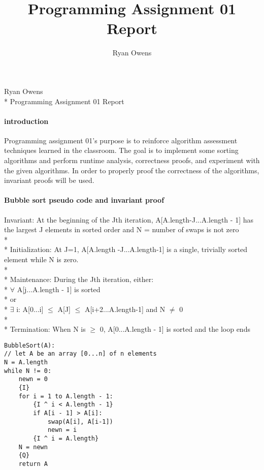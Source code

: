 \documentclass[10pt,letterpaper]{report}
\author{Ryan Owens}
\title{Programming Assignment 01 Report}
\begin{document}
	Ryan Owens
	\\* Programming Assignment 01 Report
\paragraph{introduction}
	Programming assignment 01's purpose is to reinforce algorithm assessment techniques learned in the classroom.  The goal is to implement some sorting algorithms and perform runtime analysis, correctness proofs, and experiment with the given algorithms. In order to properly proof the correctness of the algorithms, invariant proofs will be used. 
\paragraph{Bubble sort pseudo code and invariant proof}
	Invariant: At the beginning of the Jth iteration, A[A.length-J...A.length - 1] has the largest J elements in sorted order and N = number of swaps is not zero
	\\*
	\\* Initialization: At J=1, A[A.length -J...A.length-1] is a single, trivially sorted element while N is zero.
	\\*
	\\* Maintenance: During the Jth iteration, either:
	\\* $ \forall $ A[j...A.length - 1]  is sorted 
	\\* or
	\\* $ \exists$ i: A[0...i] $\leq$ A[J] $\leq$ A[i+2...A.length-1]  and N $\neq $ 0
	\\*
	\\* Termination: When N is $\geq$ 0, A[0...A.length - 1] is sorted and the loop ends
		\begin{lstlisting}
BubbleSort(A):
// let A be an array [0...n] of n elements
N = A.length
while N != 0:
	newn = 0
	{I}
	for i = 1 to A.length - 1:
		{I ^ i < A.length - 1}
		if A[i - 1] > A[i]:
			swap(A[i], A[i-1])
			newn = i
		{I ^ i = A.length}
	N = newn
	{Q}
	return A
			\end{lstlisting}
\end{document}
